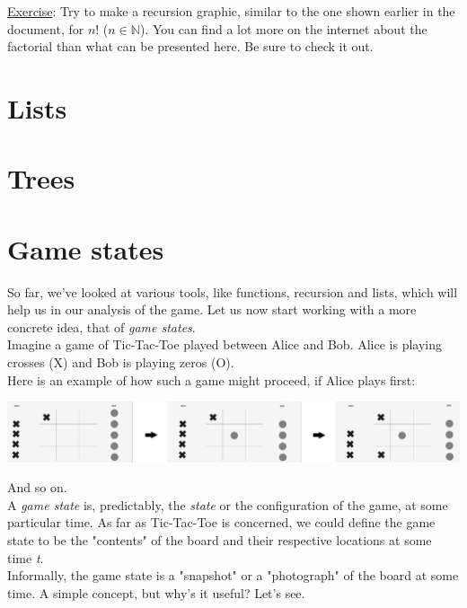 \documentclass{article}
\begin{document}
\noindent \underline{Exercise}: Try to make a recursion graphic, similar to the one shown earlier in the document, for $n!$ ($n \in \mathbb{N}$). You can find a lot more on the internet about the factorial than what can be presented here. Be sure to check it out.

\section{Lists}

\section{Trees}

\section{Game states} 

So far, we've looked at various tools, like functions, recursion and lists,
which will help us in our analysis of the game. Let us now start working with
a more concrete idea, that of \textit{game states}. \\

\noindent Imagine a game of Tic-Tac-Toe played between Alice and Bob. Alice is playing crosses (X) and Bob is playing zeros (O). \\

\noindent Here is an example of how such a game might proceed, if Alice plays first:

\begin{center}
    \includegraphics[scale=0.11]{AliceVBob}
\end{center}

\noindent And so on. \\

\noindent A \textit{game state} is, predictably, the \textit{state} or the configuration of the game, at some particular time. As far as Tic-Tac-Toe is concerned, we could define the game state to be the "contents" of the board and their respective locations at some time \textit{t}. \\

\noindent Informally, the game state is a "snapshot" or a "photograph" of the board at some time. A simple concept, but why's it useful? Let's see. 
\end{document}
